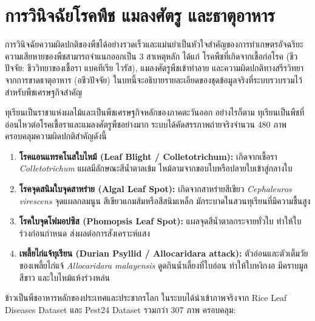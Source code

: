 \chapter{การวินิจฉัยโรคพืช แมลงศัตรู และธาตุอาหาร}
\label{ch:plant_diagnostics}

การวินิจฉัยความผิดปกติของพืชได้อย่างรวดเร็วและแม่นยำเป็นหัวใจสำคัญของการทำเกษตรอัจฉริยะ ความเสียหายของพืชสามารถจำแนกออกเป็น 3 สาเหตุหลัก ได้แก่ โรคพืชที่เกิดจากเชื้อก่อโรค (ชีวปัจจัย: ชีววิทยาของเชื้อรา แบคทีเรีย ไวรัส), แมลงศัตรูพืชเข้าทำลาย และความผิดปกติทางสรีรวิทยาจากการขาดธาตุอาหาร (อชีวปัจจัย) ในบทนี้จะอธิบายรายละเอียดของชุดข้อมูลจริงที่ระบบรวบรวมไว้สำหรับพืชเศรษฐกิจสำคัญ

\label{sec:durian_diagnostics}

ทุเรียนเป็นราชาแห่งผลไม้และเป็นพืชเศรษฐกิจหลักของภาคตะวันออก อย่างไรก็ตาม ทุเรียนเป็นพืชที่อ่อนไหวต่อโรคเชื้อราและแมลงศัตรูพืชอย่างมาก ระบบได้คัดสรรภาพถ่ายจริงจำนวน 480 ภาพ ครอบคลุมความผิดปกติสำคัญดังนี้

\begin{enumerate}
    \item \textbf{โรคแอนแทรคโนสใบไหม้ (Leaf Blight / Colletotrichum):} เกิดจากเชื้อรา \textit{Colletotrichum} แผลมีลักษณะสีน้ำตาลเข้ม ไหม้ลามจากขอบใบหรือปลายใบเข้าสู่กลางใบ
    \item \textbf{โรคจุดสนิมใบจุดสาหร่าย (Algal Leaf Spot):} เกิดจากสาหร่ายสีเขียว \textit{Cephaleuros virescens} จุดแผลกลมนูน สีเขียวแกมส้มหรือสีสนิมเหล็ก มักระบาดในสวนทุเรียนที่มีความชื้นสูง
    \item \textbf{โรคใบจุดโฟมอปซิส (Phomopsis Leaf Spot):} แผลจุดสีน้ำตาลกระจายทั่วใบ ทำให้ใบร่วงก่อนกำหนด ส่งผลต่อการสังเคราะห์แสง
    \item \textbf{เพลี้ยไก่แจ้ทุเรียน (Durian Psyllid / Allocaridara attack):} ตัวอ่อนและตัวเต็มวัยของเพลี้ยไก่แจ้ \textit{Allocaridara malayensis} ดูดกินน้ำเลี้ยงที่ใบอ่อน ทำให้ใบหงิกงอ มีคราบมูลสีขาว และใบไหม้แห้งร่วงหล่น
\end{enumerate}

\label{sec:rice_diagnostics}

ข้าวเป็นพืชอาหารหลักของประเทศและประชากรโลก ในระบบได้นำเข้าภาพจริงจาก Rice Leaf Diseases Dataset และ Pest24 Dataset รวมกว่า 307 ภาพ ครอบคลุม:

